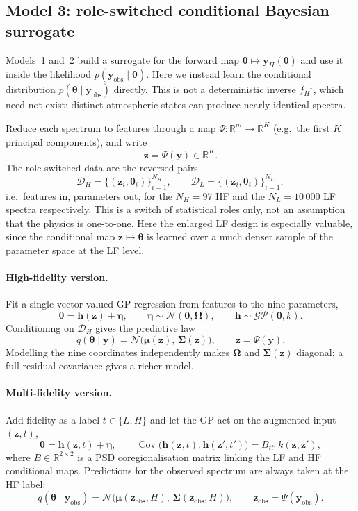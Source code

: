 \documentclass[11pt,a4paper]{article}
\newcommand{\yv}{\bm{y}}
\newcommand{\bz}{\bm{z}}          %
\newcommand{\bh}{\bm{h}}          %
\newcommand{\boldeta}{\bm{\eta}}  %
\newcommand{\bOmega}{\bm{\Omega}} %
\newcommand{\bth}{\bm{\theta}}
\newcommand{\by}{\bm{y}}
\newcommand{\bmu}{\bm{\mu}}
\newcommand{\bSigma}{\bm{\Sigma}}
\begin{document}
\subsection{Model 3: role-switched conditional Bayesian surrogate}
\label{subsec:model3-role-switched}

Models~1 and~2 build a surrogate for the forward map \(\bth\mapsto\by_H(\bth)\)
and use it inside the likelihood \(p(\yv_{\mathrm{obs}}\mid\bth)\). Here we
instead learn the conditional distribution \(p(\bth\mid\yv_{\mathrm{obs}})\)
directly. This is not a deterministic inverse \(f_H^{-1}\), which need not exist:
distinct atmospheric states can produce nearly identical spectra.

Reduce each spectrum to features through a map \(\Psi:\mathbb R^m\to\mathbb R^K\)
(e.g.\ the first \(K\) principal components), and write
\[
    \bz=\Psi(\by)\in\mathbb R^K .
\]
The role-switched data are the reversed pairs
\[
    \mathcal D_H=\{(\bz_i,\bth_i)\}_{i=1}^{N_H},
    \qquad
    \mathcal D_L=\{(\bz_i,\bth_i)\}_{i=1}^{N_L},
\]
i.e.\ features in, parameters out, for the \(N_H=97\) HF and the \(N_L=10\,000\)
LF spectra respectively. This is a
switch of statistical roles only, not an assumption that the physics is
one-to-one. Here the enlarged LF design is especially valuable, since the
conditional map \(\bz\mapsto\bth\) is learned over a much denser sample of the
parameter space at the LF level.

\paragraph{High-fidelity version.}
Fit a single vector-valued GP regression from features to the nine parameters,
\[
    \bth=\bh(\bz)+\boldeta,
    \qquad
    \boldeta\sim\mathcal N(\mathbf 0,\bOmega),
    \qquad
    \bh\sim\mathcal{GP}(\mathbf 0,k).
\]
Conditioning on \(\mathcal D_H\) gives the predictive law
\[
    q(\bth\mid\by)
    =\mathcal N\!\bigl(\bmu(\bz),\,\bSigma(\bz)\bigr),
    \qquad \bz=\Psi(\by).
\]
Modelling the nine coordinates independently makes \(\bOmega\) and
\(\bSigma(\bz)\) diagonal; a full residual covariance gives a richer model.

\paragraph{Multi-fidelity version.}
Add fidelity as a label \(t\in\{L,H\}\) and let the GP act on the augmented input
\((\bz,t)\),
\[
    \bth=\bh(\bz,t)+\boldeta,
    \qquad
    \operatorname{Cov}\!\bigl(\bh(\bz,t),\bh(\bz',t')\bigr)
    =B_{tt'}\,k(\bz,\bz'),
\]
where \(B\in\mathbb R^{2\times2}\) is a PSD coregionalisation matrix linking the
LF and HF conditional maps. Predictions for the observed spectrum are always
taken at the HF label:
\[
    q(\bth\mid\yv_{\mathrm{obs}})
    =\mathcal N\!\bigl(\bmu(\bz_{\mathrm{obs}},H),\,
                       \bSigma(\bz_{\mathrm{obs}},H)\bigr),
    \qquad \bz_{\mathrm{obs}}=\Psi(\yv_{\mathrm{obs}}).
\]
\end{document}
